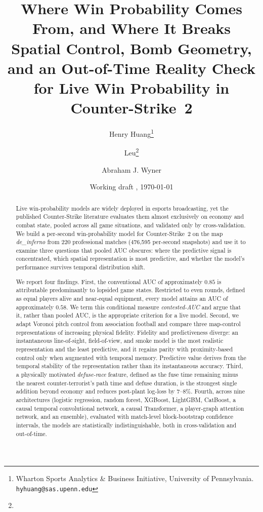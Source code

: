 \documentclass[11pt,a4paper]{article}
\title{\textbf{Where Win Probability Comes From, and Where It Breaks}\\[2mm]
\large Spatial Control, Bomb Geometry, and an Out-of-Time Reality Check
for Live Win Probability in Counter-Strike~2}
\author{Henry Huang\thanks{Wharton Sports Analytics \& Business Initiative,
University of Pennsylvania. \texttt{hyhuang@sas.upenn.edu}}
\and Leu\thanks{\todo{affiliation}}
\and Abraham J. Wyner\footnotemark[1]}
\date{Working draft \textbf{\draftversion}, \today}
\begin{document}
\maketitle

\begin{abstract}
\noindent
Live win-probability models are widely deployed in esports broadcasting, yet the
published Counter-Strike literature evaluates them almost exclusively on economy and
combat state, pooled across all game situations, and validated only by
cross-validation. We build a per-second win-probability model for Counter-Strike~2
on the map \textit{de\_inferno} from 220 professional matches (476{,}595 per-second
snapshots) and use it to examine three questions that pooled AUC obscures: where the
predictive signal is concentrated, which spatial representation is most predictive,
and whether the model's performance survives temporal distribution shift.

We report four findings. First, the conventional AUC of approximately $0.85$ is
attributable predominantly to lopsided game states. Restricted to even rounds, defined
as equal players alive and near-equal equipment, every model attains an AUC of
approximately $0.58$. We term this conditional measure \emph{contested-AUC} and argue
that it, rather than pooled AUC, is the appropriate criterion for a live model. Second,
we adapt Voronoi pitch control from association football and compare three map-control
representations of increasing physical fidelity. Fidelity and predictiveness diverge:
an instantaneous line-of-sight, field-of-view, and smoke model is the most realistic
representation and the least predictive, and it regains parity with proximity-based
control only when augmented with temporal memory. Predictive value derives from the
temporal stability of the representation rather than its instantaneous accuracy. Third,
a physically motivated \emph{defuse-race} feature, defined as the fuse time remaining
minus the nearest counter-terrorist's path time and defuse duration, is the strongest
single addition beyond economy and reduces post-plant log-loss by 7--8\%. Fourth, across
nine architectures (logistic regression, random forest, XGBoost, LightGBM, CatBoost, a
causal temporal convolutional network, a causal Transformer, a player-graph attention
network, and an ensemble), evaluated with match-level block-bootstrap confidence
intervals, the models are statistically indistinguishable, both in cross-validation and
out-of-time.


\end{abstract}
\end{document}
